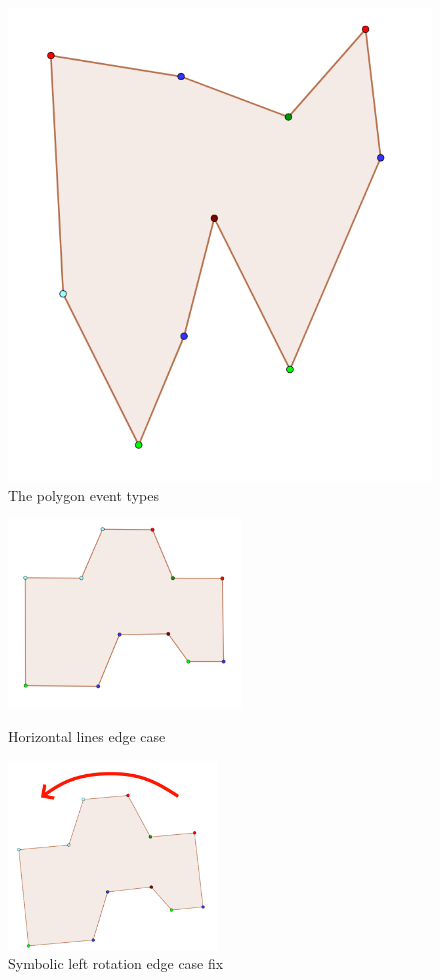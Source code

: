 \documentclass[12pt]{article}
\begin{document}
\begin{figure}[H]
    \centering
    \includegraphics[width=0.5\linewidth]{Images/intersection_eventAssignment.png}
    \caption{The polygon event types}
    \label{fig:intersectionEventTypes}
\end{figure}
\begin{figure}[H]
    \centering
    \includegraphics[height=5cm]{Images/intersection_eventAssignmentEdgeCase.png}
    \caption{Horizontal lines edge case}
    \label{fig:intersectionHorizontalLines}
    \endminipage\hfill
    \centering
    \includegraphics[height=5cm]{Images/intersection_eventAssignmentEdgeCaseRotated.png}
    \caption{Symbolic left rotation edge case fix}
    \label{fig:intersectionHorizontalLinesRotated}
    \endminipage
\end{figure}
\end{document}
